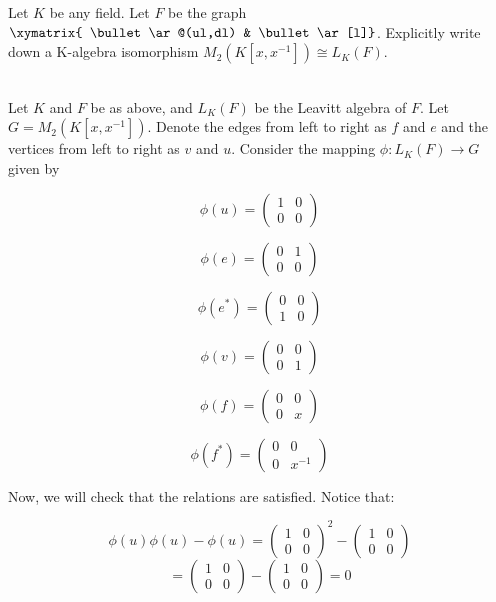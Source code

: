 Let $K$ be any field. Let $F$ be the graph \ \ \  \ 
$\xymatrix{ \bullet \ar@(ul,dl)  & \bullet \ar[l]}$. Explicitly write down a K-algebra isomorphism 
$M_2(K[x,x^{-1}])\cong L_K(F)$.\\

\begin{solution}\renewcommand{\qedsymbol}{}\ \\
    Let $K$ and $F$ be as above, and $L_K(F)$ be the Leavitt algebra of $F$. Let $G=M_2(K[x,x^{-1}])$. 
    Denote the edges from left to right as $f$ and $e$ and the vertices from left to right as $v$ and 
    $u$. Consider the mapping $\phi:L_K(F)\rightarrow G$ given by

    $$\phi(u)=\left(\begin{array}{cc} 1 & 0 \\ 0 & 0 \end{array}\right)$$

    $$\phi(e)=\left(\begin{array}{cc} 0 & 1 \\ 0 & 0 \end{array}\right)$$

    $$\phi(e^*)=\left(\begin{array}{cc} 0 & 0 \\ 1 & 0 \end{array}\right)$$

    $$\phi(v)=\left(\begin{array}{cc} 0 & 0 \\ 0 & 1 \end{array}\right)$$

    $$\phi(f)=\left(\begin{array}{cc} 0 & 0 \\ 0 & x \end{array}\right)$$

    $$\phi(f^*)=\left(\begin{array}{cc} 0 & 0 \\ 0 & x^{-1} \end{array}\right)$$

    Now, we will check that the relations are satisfied. Notice that:

    $$\phi(u)\phi(u)-\phi(u)=\left(\begin{array}{cc} 1 & 0 \\ 0 & 0 \end{array}\right)^2-
    \left(\begin{array}{cc} 1 & 0 \\ 0 & 0 \end{array}\right)$$
    $$=\left(\begin{array}{cc} 1 & 0 \\ 0 & 0 \end{array}\right)-
    \left(\begin{array}{cc} 1 & 0 \\ 0 & 0 \end{array}\right)=0$$


\end{solution}
